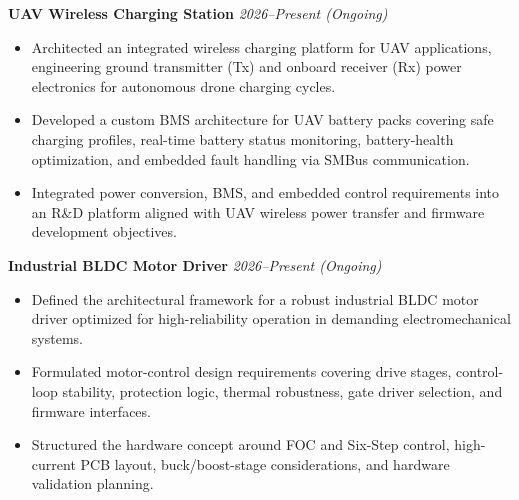 \documentclass[a4paper,10pt]{article}
\newcommand{\projectheading}[2]{%
  \vspace{4pt}\noindent\textbf{#1} \hfill \textit{\small #2}\\%
}
\begin{document}
\projectheading{UAV Wireless Charging Station}{2026--Present \normalfont\small(Ongoing)}
\begin{itemize}
  \item Architected an integrated wireless charging platform for UAV applications, engineering
        ground transmitter (Tx) and onboard receiver (Rx) power electronics for autonomous
        drone charging cycles.
  \item Developed a custom BMS architecture for UAV battery packs covering safe charging
        profiles, real-time battery status monitoring, battery-health optimization, and embedded
        fault handling via SMBus communication.
  \item Integrated power conversion, BMS, and embedded control requirements into an R\&D
        platform aligned with UAV wireless power transfer and firmware development
        objectives.
\end{itemize}

\projectheading{Industrial BLDC Motor Driver}{2026--Present \normalfont\small(Ongoing)}
\begin{itemize}
  \item Defined the architectural framework for a robust industrial BLDC motor driver
        optimized for high-reliability operation in demanding electromechanical systems.
  \item Formulated motor-control design requirements covering drive stages, control-loop
        stability, protection logic, thermal robustness, gate driver selection, and
        firmware interfaces.
  \item Structured the hardware concept around FOC and Six-Step control, high-current PCB
        layout, buck/boost-stage considerations, and hardware validation planning.
\end{itemize}
\end{document}
